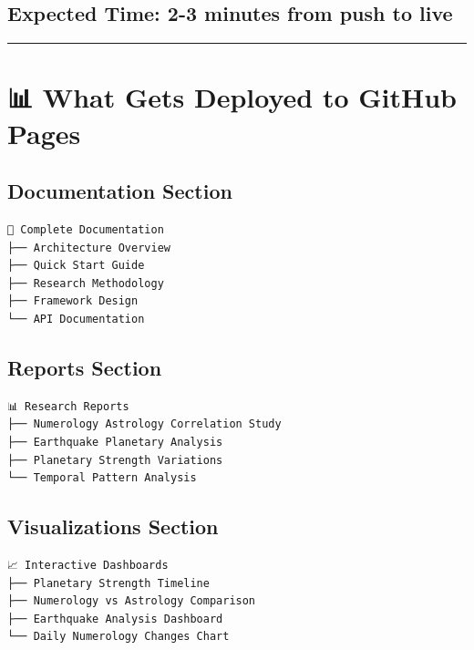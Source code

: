 \documentclass[
  11pt,
  oneside,
  openany]{scrbook}
\begin{document}
\section{\texorpdfstring{\textbf{Expected Time:} 2-3 minutes from push
to
live}{Expected Time: 2-3 minutes from push to live}}\label{expected-time-2-3-minutes-from-push-to-live}

\begin{center}\rule{0.5\linewidth}{0.5pt}\end{center}

\chapter{📊 What Gets Deployed to GitHub
Pages}\label{what-gets-deployed-to-github-pages}

\section{\texorpdfstring{\textbf{Documentation
Section}}{Documentation Section}}\label{documentation-section}

\begin{verbatim}
📖 Complete Documentation
├── Architecture Overview
├── Quick Start Guide
├── Research Methodology
├── Framework Design
└── API Documentation
\end{verbatim}

\section{\texorpdfstring{\textbf{Reports
Section}}{Reports Section}}\label{reports-section}

\begin{verbatim}
📊 Research Reports
├── Numerology Astrology Correlation Study
├── Earthquake Planetary Analysis
├── Planetary Strength Variations
└── Temporal Pattern Analysis
\end{verbatim}

\section{\texorpdfstring{\textbf{Visualizations
Section}}{Visualizations Section}}\label{visualizations-section}

\begin{verbatim}
📈 Interactive Dashboards
├── Planetary Strength Timeline
├── Numerology vs Astrology Comparison
├── Earthquake Analysis Dashboard
└── Daily Numerology Changes Chart
\end{verbatim}
\end{document}
